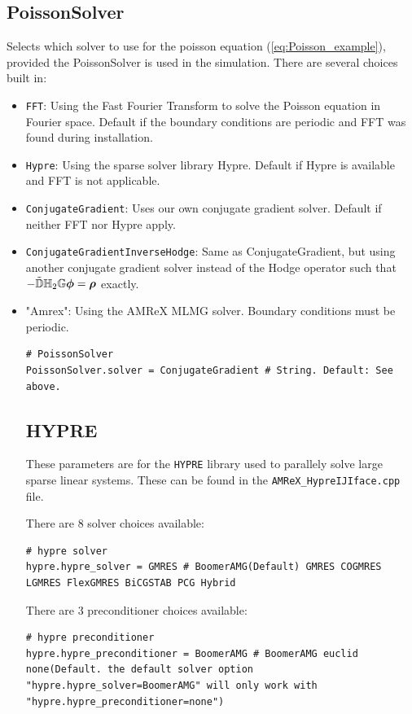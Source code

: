 \documentclass[11pt]{article}
\begin{document}
\subsection{PoissonSolver}
Selects which solver to use for the poisson equation (\ref{eq:Poisson_example}), provided the PoissonSolver is used in the simulation.
There are several choices built in:
\begin{itemize}
   \item \lstinline[language=pkgconfig]{FFT}: Using the Fast Fourier Transform to solve the Poisson equation in Fourier space. Default if the boundary conditions are periodic and FFT was found during installation.
   \item \lstinline[language=pkgconfig]{Hypre}: Using the sparse solver library Hypre. Default if Hypre is available and FFT is not applicable.
   \item \lstinline[language=pkgconfig]{ConjugateGradient}: Uses our own conjugate gradient solver. Default if neither FFT nor Hypre apply.
   \item \lstinline[language=pkgconfig]{ConjugateGradientInverseHodge}: Same as ConjugateGradient, but using another conjugate gradient solver instead of the Hodge operator such that $-\tilde{\mathbb{D}}{\mathbb{H}}_2\mathbb{G}{\boldsymbol {\rm \mathsf{\phi}}}={\boldsymbol {\rm \mathsf{\rho}}}$ exactly.
   \item "Amrex": Using the AMReX MLMG solver. Boundary conditions must be periodic.
\begin{lstlisting}[language=pkgconfig]
# PoissonSolver
PoissonSolver.solver = ConjugateGradient # String. Default: See above.
\end{lstlisting}

\subsection{HYPRE}
These parameters are for the \verb|HYPRE| library used to parallely solve large sparse linear systems. These can be found in the \verb|AMReX_HypreIJIface.cpp| file.

There are 8 solver choices available:
\begin{lstlisting}[language=pkgconfig]
# hypre solver
hypre.hypre_solver = GMRES # BoomerAMG(Default) GMRES COGMRES LGMRES FlexGMRES BiCGSTAB PCG Hybrid
\end{lstlisting}

There are 3 preconditioner choices available: 
\begin{lstlisting}[language=pkgconfig]
# hypre preconditioner
hypre.hypre_preconditioner = BoomerAMG # BoomerAMG euclid none(Default. the default solver option "hypre.hypre_solver=BoomerAMG" will only work with "hypre.hypre_preconditioner=none")
\end{lstlisting}


\end{itemize}
\end{document}

